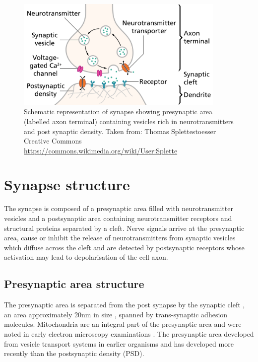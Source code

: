 \begin{figure}
    \centering
    \includegraphics[width=0.9\textwidth]{images/SynapseSchematic_en.png}
    \caption[Schemtatic representation of synapse]{Schematic representation of synapse showing presynaptic area (labelled axon terminal) containing vesicles rich in neurotransmitters and post synaptic density.  Taken from: Thomas Splettestoesser Creative Commons \url{https://commons.wikimedia.org/wiki/User:Splette}}
    \label{fig:synapse}
\end{figure}








\section{Synapse structure}
\label{sec:Synaptic structure}
The synapse is composed of a presynaptic area filled with neurotransmitter vesicles and a postsynaptic area containing neurotransmitter receptors and structural proteins separated by a cleft. Nerve signals arrive at the presynaptic area, cause or inhibit the release of neurotransmitters from synaptic vesicles which diffuse across the cleft and are detected by postsynaptic receptors whose activation may lead to depolarisation of the cell axon. 

%

\subsection{Presynaptic area structure}
The presynaptic area is separated from the post synapse by the synaptic cleft \cite{rusakov2011shaping}, an area approximately 20nm in size \cite{zuber2005mammalian},
spanned by trans-synaptic adhesion molecules\cite{missler2012synaptic}.
Mitochondria \cite{lassek2014proteome} are an integral part of the presynaptic area and were noted in early electron microscopy  examinations \cite{gray1959electron}. The presynaptic area developed from vesicle transport systems in earlier organisms and has developed more recently than the postsynaptic density (PSD)\cite{emes2012evolution}.

